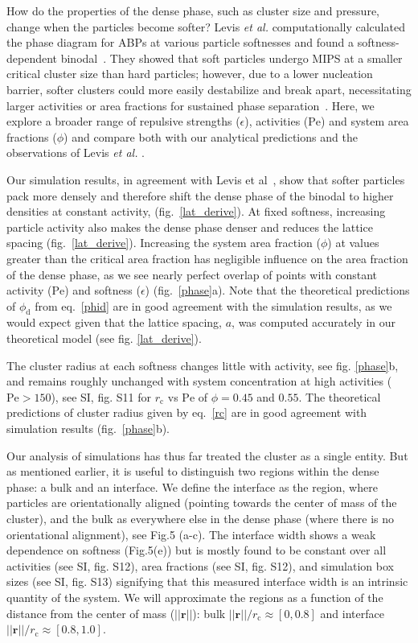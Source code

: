 \documentclass[twoside,twocolumn,9pt]{article}
\begin{document}
How do the properties of the dense phase, such as cluster size and pressure, change when the particles become softer? Levis \textit{et al.} computationally calculated the phase diagram for ABPs at various particle softnesses and found a softness-dependent binodal~\cite{Levis2017}. They showed that soft particles undergo MIPS at a smaller critical cluster size than hard particles; however, due to a lower nucleation barrier, softer clusters could more easily destabilize and break apart, necessitating larger activities or area fractions for sustained phase separation~\cite{Levis2017}. Here, we explore a broader range of repulsive strengths ($\epsilon$), activities ($\mathrm{Pe}$) and system area fractions ($\phi$) and compare both with our analytical predictions and the observations of Levis \textit{et al.} \cite{Levis2017}. 

Our simulation results, in agreement with Levis et al~\cite{Levis2017}, show that softer particles pack more densely and therefore shift the dense phase of the binodal to higher densities at constant activity, (fig.~\ref{lat_derive}). At fixed softness, increasing particle activity also makes the dense phase denser and reduces the lattice spacing (fig.~\ref{lat_derive}). Increasing the system area fraction ($\phi$) at values greater than the critical area fraction has negligible influence on the area fraction of the dense phase, as we see nearly perfect overlap of points with constant activity ($\mathrm{Pe}$) and softness ($\epsilon$) (fig.~\ref{phase}a). Note that the theoretical predictions of $\phi_\text{d}$ from eq.~\ref{phid} are in good agreement with the simulation results, as we would expect given that the lattice spacing, $a$, was computed accurately in our theoretical model (see fig. \ref{lat_derive}).

The cluster radius at each softness changes little with activity, see fig. \ref{phase}b, and remains roughly unchanged with system concentration at high activities ($\mathrm{Pe}>150$), see SI, fig. S11 for $r_\text{c}$ vs $\mathrm{Pe}$ of $\phi=0.45$ and $0.55$. The theoretical predictions of cluster radius given by eq.~\ref{rc} are in good agreement with simulation results (fig.~\ref{phase}b). 

Our analysis of simulations has thus far treated the cluster as a single entity. But as mentioned earlier, it is useful to distinguish two regions within the dense phase: a bulk and an interface. We define the interface as the region, where particles are orientationally aligned (pointing towards the center of mass of the cluster), and the bulk as everywhere else in the dense phase (where there is no orientational alignment), see Fig.5 (a-c). The interface width shows a weak dependence on softness (Fig.5(e)) but is mostly found to be constant over all activities (see SI, fig. S12), area fractions (see SI, fig. S12), and simulation box sizes (see SI, fig. S13) signifying that this measured interface width is an intrinsic quantity of the system. We will approximate the regions as a function of the distance from the center of mass ($||\mathbf{r}||$): bulk $||\mathbf{r}||/r_\text{c}\approx[0,0.8]$ and interface $||\mathbf{r}||/r_\text{c}\approx[0.8,1.0]$.
\end{document}
